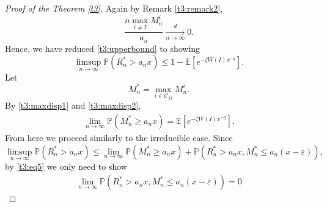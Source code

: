 \documentclass[12pt]{article}
\numberwithin{equation}{section}
\newcommand{\E}{\mathbb{E}}
\begin{document}
\begin{proof}[Proof of the Theorem \ref{t3}]
Again by Remark \ref{t3:remark2}, \[\frac{n\max\limits_{i \neq I}M^i_n} {a_n} \xrightarrow[n \rightarrow \infty]{d} 0.\]
 Hence, we have reduced \eqref{t3:upperbound} to showing 
   \begin{equation}\label{t3:upperbound2}
            \limsup_{n \rightarrow \infty}  \mathbb{P} \left( R^*_n > a_n x\right)\leq 1- \E[e^{-\zeta W(I)x^{-q}}].
    \end{equation}
 Let \[
 M^*_n = \max_{i \in \mathcal{C}_M} M^i_n.
 \]
 By \eqref{t3:maxdisp1} and \eqref{t3:maxdisp2}, 
 \begin{align}\label{t3:eq5}
 \lim_{n\rightarrow \infty} \mathbb{P}\left(M^*_n \geq a_n x\right) =\E[e^{-\zeta W(I)x^{-q}}].
 \end{align}
 From here we proceed similarly to the irreducible case. Since
 \[
 \limsup_{n \rightarrow \infty}  \mathbb{P} \left( R^*_n > a_n x\right) \leq  \lim_{n\rightarrow \infty} \mathbb{P}\left(M^*_n \geq a_n x\right) + \mathbb{P} \left( R^*_n > a_n x, M^*_n \leq a_n(x-\varepsilon)\right),
 \]
 by \eqref{t3:eq5} we only need to show 
\begin{align*} \lim_{n \rightarrow \infty} \mathbb{P} \left( R^*_n > a_n x, M^*_n \leq a_n(x-\varepsilon)\right) = 0
\end{align*}


\end{proof}
\end{document}
